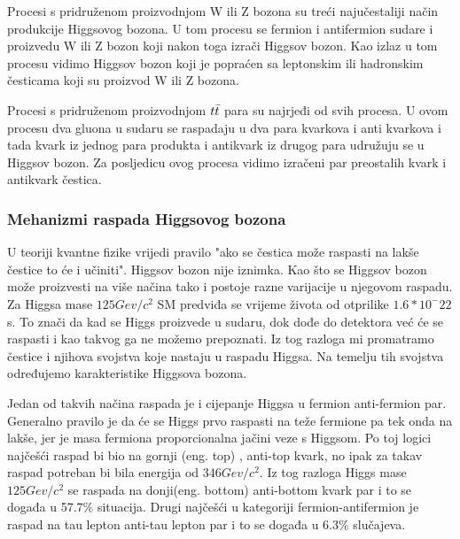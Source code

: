 \documentclass[12pt,a4paper,oneside]{article}
\begin{document}
\begin{linenumbers}
		Procesi s pridruženom proizvodnjom W ili Z bozona su treći najučestaliji način produkcije Higgsovog bozona. U tom procesu se fermion i antifermion sudare i proizvedu W ili Z bozon koji nakon toga izrači Higgsov bozon. Kao izlaz u tom procesu vidimo Higgsov bozon koji je popraćen sa leptonskim ili hadronskim česticama koji su proizvod  W ili Z bozona.
		
		Procesi s pridruženom proizvodnjom \begin{math}
		\boldmath{t \bar{t}}
		\end{math}  para su najrjeđi od svih procesa. U ovom procesu dva gluona u sudaru se raspadaju u dva para kvarkova i anti kvarkova i tada kvark iz jednog para produkta i antikvark iz drugog para udružuju se u Higgsov bozon. Za posljedicu ovog procesa vidimo izračeni par preostalih kvark i antikvark čestica.
		
		\subsubsection{Mehanizmi raspada Higgsovog bozona}
		U teoriji kvantne fizike vrijedi pravilo "ako se čestica može raspasti na lakše čestice to će i učiniti". Higgsov bozon nije iznimka. Kao što se Higgsov bozon može proizvesti na više načina tako i postoje razne varijacije u njegovom raspadu. Za Higgsa mase \begin{math}
		125 Gev/c^2
		\end{math} SM predviđa se vrijeme života od otprilike \begin{math}
		1.6 * 10^-22
		\end{math} s. To znači da kad se Higgs proizvede u sudaru, dok dođe do detektora već će se raspasti i kao takvog ga ne možemo prepoznati. Iz tog razloga mi promatramo čestice i njihova svojstva koje nastaju u raspadu Higgsa. Na temelju tih svojstva određujemo karakteristike Higgsova bozona.
	
	Jedan od takvih načina raspada je i cijepanje Higgsa u fermion anti-fermion par. Generalno pravilo je da će se Higgs prvo raspasti na teže fermione pa tek onda na lakše, jer je masa fermiona proporcionalna jačini veze s Higgsom. Po toj logici najčešći raspad bi bio na gornji (eng. top) , anti-top kvark, no ipak za takav raspad potreban bi bila energija od \begin{math}
	346Gev/c^2
	\end{math}. Iz tog razloga Higgs mase \begin{math}
	125 Gev/c^2
	\end{math} se raspada na donji(eng. bottom) anti-bottom kvark par i to se događa u 57.7\% situacija. Drugi najčešći u kategoriji fermion-antifermion je raspad na tau lepton anti-tau lepton par i to se događa u 6.3\% slučajeva.
		

\end{linenumbers}
\end{document}
